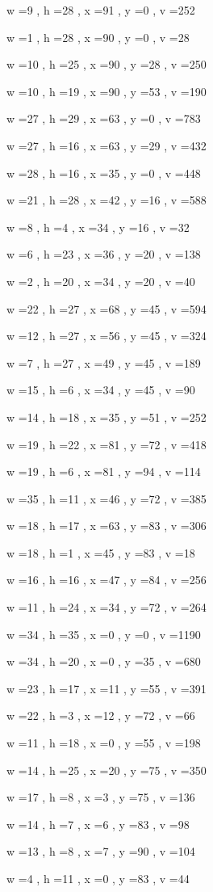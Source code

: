 \documentclass[11pt]{article}
\begin{document}
w =9 , h =28 , x =91 , y =0 , v =252
\par
w =1 , h =28 , x =90 , y =0 , v =28
\par
w =10 , h =25 , x =90 , y =28 , v =250
\par
w =10 , h =19 , x =90 , y =53 , v =190
\par
w =27 , h =29 , x =63 , y =0 , v =783
\par
w =27 , h =16 , x =63 , y =29 , v =432
\par
w =28 , h =16 , x =35 , y =0 , v =448
\par
w =21 , h =28 , x =42 , y =16 , v =588
\par
w =8 , h =4 , x =34 , y =16 , v =32
\par
w =6 , h =23 , x =36 , y =20 , v =138
\par
w =2 , h =20 , x =34 , y =20 , v =40
\par
w =22 , h =27 , x =68 , y =45 , v =594
\par
w =12 , h =27 , x =56 , y =45 , v =324
\par
w =7 , h =27 , x =49 , y =45 , v =189
\par
w =15 , h =6 , x =34 , y =45 , v =90
\par
w =14 , h =18 , x =35 , y =51 , v =252
\par
w =19 , h =22 , x =81 , y =72 , v =418
\par
w =19 , h =6 , x =81 , y =94 , v =114
\par
w =35 , h =11 , x =46 , y =72 , v =385
\par
w =18 , h =17 , x =63 , y =83 , v =306
\par
w =18 , h =1 , x =45 , y =83 , v =18
\par
w =16 , h =16 , x =47 , y =84 , v =256
\par
w =11 , h =24 , x =34 , y =72 , v =264
\par
w =34 , h =35 , x =0 , y =0 , v =1190
\par
w =34 , h =20 , x =0 , y =35 , v =680
\par
w =23 , h =17 , x =11 , y =55 , v =391
\par
w =22 , h =3 , x =12 , y =72 , v =66
\par
w =11 , h =18 , x =0 , y =55 , v =198
\par
w =14 , h =25 , x =20 , y =75 , v =350
\par
w =17 , h =8 , x =3 , y =75 , v =136
\par
w =14 , h =7 , x =6 , y =83 , v =98
\par
w =13 , h =8 , x =7 , y =90 , v =104
\par
w =4 , h =11 , x =0 , y =83 , v =44
\par
\newpage
\end{document}

